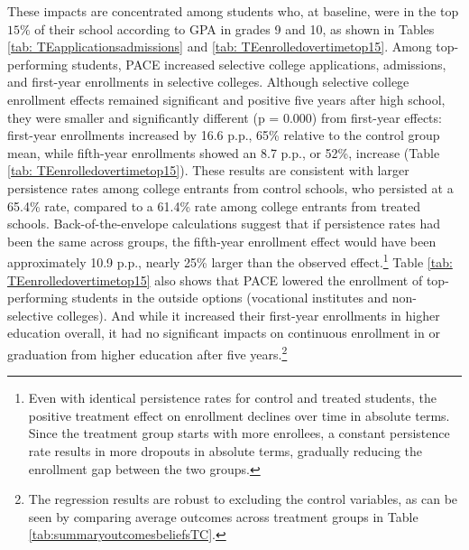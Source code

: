 These impacts are concentrated among students who, at baseline, were in the top $15\%$ of their school according to GPA in grades 9 and 10, as shown in Tables \ref{tab: TEapplicationsadmissions} and \ref{tab: TEenrolledovertimetop15}. Among top-performing students, PACE increased selective college applications, admissions, and first-year enrollments in selective colleges. Although selective college enrollment effects remained significant and positive five years after high school, they were smaller and significantly different (p = 0.000) from first-year effects: first-year enrollments increased by 16.6 p.p., 65\% relative to the control group mean, while fifth-year enrollments showed an 8.7 p.p., or 52\%, increase (Table \ref{tab: TEenrolledovertimetop15}). These results are consistent with larger persistence rates among college entrants from control schools, who persisted at a 65.4\% rate, compared to a 61.4\% rate among college entrants from treated schools. Back-of-the-envelope calculations suggest that if persistence rates had been the same across groups, the fifth-year enrollment effect would have been approximately 10.9 p.p., nearly 25\% larger than the observed effect.\footnote{Even with identical persistence rates for control and treated students, the positive treatment effect on enrollment declines over time in absolute terms. Since the treatment group starts with more enrollees, a constant persistence rate results in more dropouts in absolute terms, gradually reducing the enrollment gap between the two groups.} Table \ref{tab: TEenrolledovertimetop15} also shows that PACE lowered the enrollment of top-performing students in the outside options (vocational institutes and non-selective colleges). And while it increased their first-year enrollments in higher education overall, it had no significant impacts on continuous enrollment in or graduation from higher education after five years.\footnote{The regression results are robust to excluding the control variables, as can be seen by comparing average outcomes across treatment groups in Table \ref{tab:summaryoutcomesbeliefsTC}.}\par 




